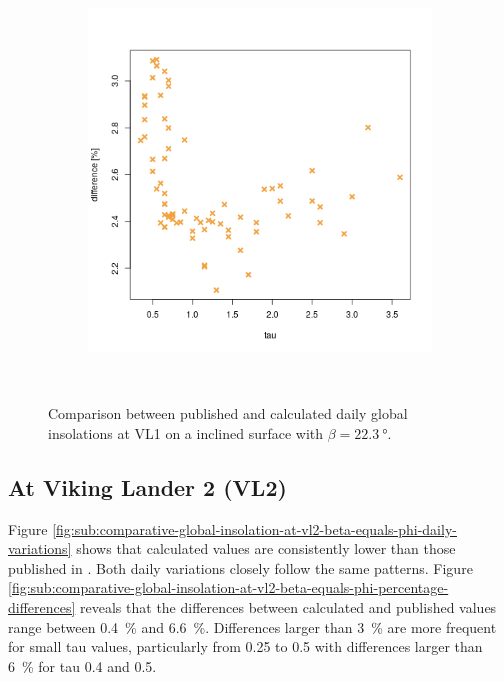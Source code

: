 \begin{figure}[H]
\begin{subfigure}[t]{\subfigureWidth}
            \label{fig:sub:comparative-global-insolation-at-vl1-beta-equals-phi-daily-variations}
    \end{subfigure}\hfill
    \begin{subfigure}[t]{\subfigureWidth}
        \centering
            \includegraphics[height=\graphicsHeight]{sections/appendix/A/plots/h-diff-bet-exp-calc-at-vl1-with-beta-223-deg.png}
            \label{fig:sub:comparative-global-insolation-at-vl1-beta-equals-phi-percentage-differences}
    \end{subfigure}\\[0.8ex]
    \caption{Comparison between published and calculated daily global insolations at VL1 on a inclined surface with $\beta=\SI{22.3}{\degree}$.}
    \label{fig:plot:comparative-global-insolation-at-vl1-beta-equals-phi}
\vspace{-2ex}
\end{figure}

\subsection{At Viking Lander 2 (VL2)}
Figure \ref{fig:sub:comparative-global-insolation-at-vl2-beta-equals-phi-daily-variations} shows that calculated values are consistently lower than those published in . Both daily variations closely follow the same patterns. Figure \ref{fig:sub:comparative-global-insolation-at-vl2-beta-equals-phi-percentage-differences} reveals that the differences between calculated and published values range between \SI{0.4}{\percent} and \SI{6.6}{\percent}. Differences larger than \SI{3}{\percent} are more frequent for small tau values, particularly from 0.25 to 0.5 with differences larger than \SI{6}{\percent} for tau 0.4 and 0.5.

